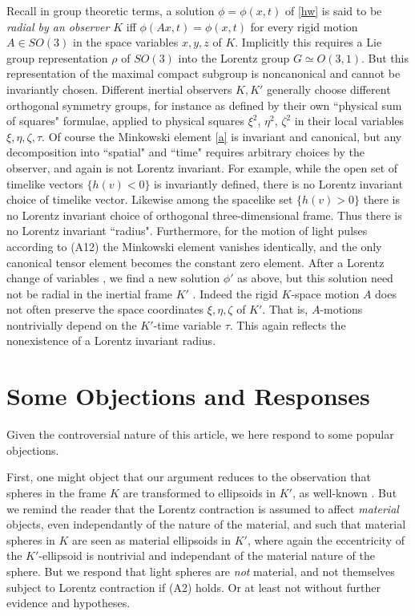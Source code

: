 \documentclass[12pt]{amsart}
\theoremstyle{definition}
\theoremstyle{remark}
\begin{document}
Recall in group theoretic terms, a solution $\phi=\phi(x,t)$ of \eqref{hw} is said to be \emph{radial by an observer $K$} iff $\phi(Ax,t)=\phi(x,t)$ for every rigid motion $A\in SO(3)$ in the space variables $x,y,z$ of $K$. Implicitly this requires a Lie group representation $\rho$ of $SO(3)$ into the Lorentz group $G\simeq O(3,1)$. But this representation of the maximal compact subgroup is noncanonical and cannot be invariantly chosen. Different inertial observers $K, K'$ generally choose different orthogonal symmetry groups, for instance as defined by their own ``physical sum of squares" formulae, applied to physical squares $\xi^2$, $\eta^2$, $\zeta^2$ in their local variables $\xi, \eta, \zeta, \tau$. Of course the Minkowski element \eqref{a} is invariant and canonical, but any decomposition into ``spatial" and ``time" requires arbitrary choices by the observer, and again is not Lorentz invariant. For example, while the open set of timelike vectors $\{h(v)<0\}$ is invariantly defined, there is no Lorentz invariant choice of timelike vector. Likewise among the spacelike set $\{h(v)>0\}$ there is no Lorentz invariant choice of orthogonal three-dimensional frame. Thus there is no Lorentz invariant ``radius". Furthermore, for the motion of light pulses according to (A12) the Minkowski element vanishes identically, and the only canonical tensor element becomes the constant zero element. After a Lorentz change of variables , we find a new solution $\phi'$ as above, but this solution need not be radial in the inertial frame $K'$ . Indeed the rigid $K$-space motion $A$ does not often preserve the space coordinates $\xi, \eta, \zeta$ of $K'$. That is, $A$-motions nontrivially depend on the $K'$-time variable $\tau$. This again reflects the nonexistence of a Lorentz invariant radius.








\section{Some Objections and Responses}
Given the controversial nature of this article, we here respond to some popular objections. 

First, one might object that our argument reduces to the observation that spheres in the frame $K$ are transformed to ellipsoids in $K'$, as well-known \cite[\S 4]{einstein1905electrodynamics}. But we remind the reader that the Lorentz contraction is assumed to affect \emph{material} objects, even independantly of the nature of the material, and such that material spheres in $K$ are seen as material ellipsoids in $K'$, where again the eccentricity of the $K'$-ellipsoid is nontrivial and independant of the material nature of the sphere. But we respond that light spheres are \emph{not} material, and not themselves subject to Lorentz contraction if (A2) holds. Or at least not without further evidence and hypotheses. %
\end{document}
